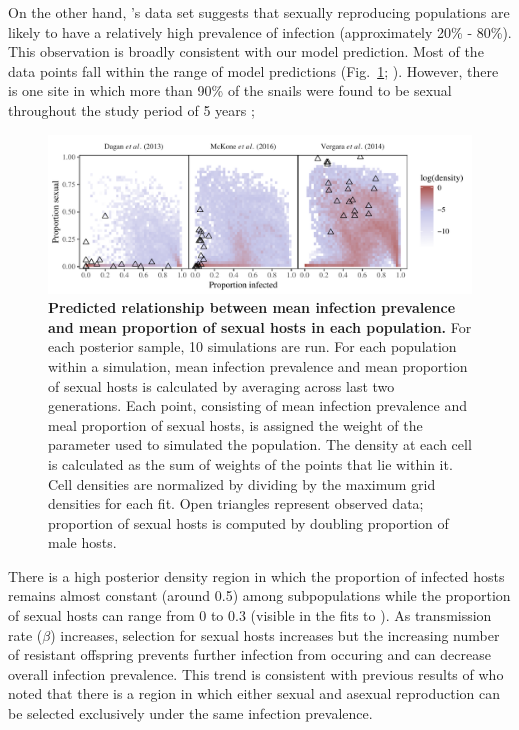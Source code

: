 \documentclass{article}\usepackage[]{graphicx}\usepackage[]{color}
\newcommand{\citetapos}[1]{\citeauthor{#1}'s \citeyearpar{#1}}
\newcommand{\fref}[1]{Fig.~\ref{fig:#1}}
\begin{document}
On the other hand, \citetapos{vergara2014infection} data set suggests that sexually reproducing populations are likely to have a relatively high prevalence of infection (approximately 20\% - 80\%).
This observation is broadly consistent with our model prediction. 
Most of the data points fall within the range of model predictions (\fref{ivs}; \cite{vergara2014infection}).
However, there is one site in which more than 90\% of the snails were found to be sexual throughout the study period of 5 years \citep{vergara2014infection};

\begin{figure}[!ht]
\includegraphics[width=\textwidth]{../fig/simulated_data2.pdf}
\caption{{\bf Predicted relationship between mean infection prevalence and mean proportion of sexual hosts in each population.}
For each posterior sample, 10 simulations are run.
For each population within a simulation, mean infection prevalence and mean proportion of sexual hosts is calculated by averaging across last two generations. 
Each point, consisting of mean infection prevalence and meal proportion of sexual hosts, is assigned the weight of the parameter used to simulated the population.
The density at each cell is calculated as the sum of weights of the points that lie within it.
Cell densities are normalized by dividing by the maximum grid densities for each fit.
Open triangles represent observed data; proportion of sexual hosts is computed by doubling proportion of male hosts.
}
\label{fig:ivs}
\end{figure}

There is a high posterior density region in which the proportion of infected hosts remains almost constant (around 0.5) among subpopulations while the proportion of sexual hosts can range from 0 to 0.3 (visible in the fits to \cite{mckone2016fine}).
As transmission rate ($\beta$) increases, selection for sexual hosts increases but the increasing number of resistant offspring prevents further infection from occuring and can decrease overall infection prevalence.
This trend is consistent with previous results of \cite{lively2001trematode} who noted that there is a region in which either sexual and asexual reproduction can be selected exclusively under the same infection prevalence.
\end{document}
